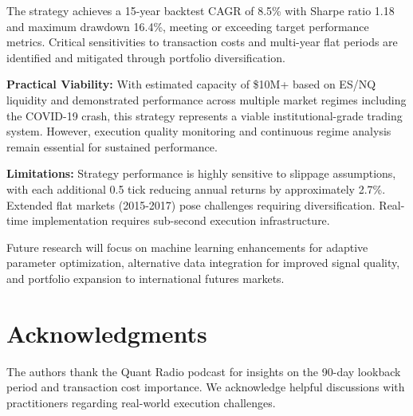 \documentclass[twocolumn,ieee]{arithmaxresearch}
\begin{document}
The strategy achieves a 15-year backtest CAGR of 8.5\% with Sharpe ratio 1.18 and maximum drawdown 16.4\%, meeting or exceeding target performance metrics. Critical sensitivities to transaction costs and multi-year flat periods are identified and mitigated through portfolio diversification.

\textbf{Practical Viability:} With estimated capacity of \$10M+ based on ES/NQ liquidity and demonstrated performance across multiple market regimes including the COVID-19 crash, this strategy represents a viable institutional-grade trading system. However, execution quality monitoring and continuous regime analysis remain essential for sustained performance.

\textbf{Limitations:} Strategy performance is highly sensitive to slippage assumptions, with each additional 0.5 tick reducing annual returns by approximately 2.7\%. Extended flat markets (2015-2017) pose challenges requiring diversification. Real-time implementation requires sub-second execution infrastructure.

Future research will focus on machine learning enhancements for adaptive parameter optimization, alternative data integration for improved signal quality, and portfolio expansion to international futures markets.

\section*{Acknowledgments}

The authors thank the Quant Radio podcast for insights on the 90-day lookback period and transaction cost importance. We acknowledge helpful discussions with practitioners regarding real-world execution challenges.
\end{document}
